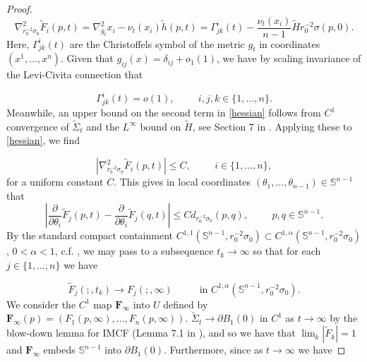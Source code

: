 \documentclass[12pt,twoside]{article}
\theoremstyle{plain}
\theoremstyle{definition}
\theoremstyle{remark}
\numberwithin{equation}{section}
\begin{document}
\begin{proof}
\begin{equation} \label{hessian}
    \nabla^{2}_{r_{0}^{-2}\sigma_{0}} \widetilde{F}_{i} (p,t) = \nabla^{2}_{g_{t}} x_{i} - \nu_{t}(x_{i}) \widetilde{h}(p,t) = \Gamma^{i}_{jk}(t) - \frac{\nu_{t}(x_{i})}{n-1} \widetilde{H} r_{0}^{-2} \sigma(p,0). 
\end{equation}
Here, $\Gamma^{i}_{jk}(t)$ are the Christoffels symbol of the metric $g_{t}$ in coordinates $(x^{1},\dots,x^{n})$. Given that $g_{ij}(x) = \delta_{ij} + o_{1}(1)$, we have by scaling invariance of the Levi-Civita connection that

\begin{equation*}
    \Gamma^{i}_{jk}(t) = o(1), \hspace{1cm} i,j,k \in \{ 1, \dots, n \}. 
\end{equation*}
Meanwhile, an upper bound on the second term in \eqref{hessian} follows from $C^{1}$ convergence of $\widetilde{\Sigma}_{t}$ and the $L^{\infty}$ bound on $\widetilde{H}$, see Section 7 in \cite{HI}. Applying these to \eqref{hessian}, we find

\begin{equation*}
    |\nabla^{2}_{r_{0}^{-2} \sigma_{0}} \widetilde{F}_{i}(p,t) | \leq C, \hspace{1cm} i \in \{ 1, \dots, n \},
\end{equation*}
for a uniform constant $C$. This gives in local coordinates $(\theta_{1},\dots,\theta_{n-1}) \in \mathbb{S}^{n-1}$ that
\begin{equation*}
    |\frac{\partial}{\partial \theta_{i}} \widetilde{F}_{j}(p,t) - \frac{\partial}{\partial \theta_{i}} \widetilde{F}_{j}(q,t)| \leq C d_{r_{0}^{-2} \sigma_{0}} (p, q), \hspace{1cm} p,q \in \mathbb{S}^{n-1}. 
\end{equation*}
By the standard compact containment $C^{1,1}(\mathbb{S}^{n-1},r_{0}^{-2} \sigma_{0}) \subset C^{1,\alpha}(\mathbb{S}^{n-1}, r_{0}^{-2} \sigma_{0})$, $0 <\alpha <1$, c.f. \cite{Aub}, we may pass to a subsequence $t_{k} \rightarrow \infty$ so that for each $j \in \{ 1, \dots, n \}$ we have

\begin{equation} \label{limit_map}
    \widetilde{F}_{j} ( ;, t_{k}) \rightarrow F_{j} (;,\infty) \hspace{1cm} \text{ in    } C^{1,\alpha}(\mathbb{S}^{n-1}, r_{0}^{-2} \sigma_{0}).
\end{equation}
We consider the $C^{1}$ map $\mathbf{F}_{\infty}$ into $U$ defined by $\mathbf{F}_{\infty}(p)= (F_{1}(p,\infty), \dots, F_{n}(p,\infty))$. $\widetilde{\Sigma}_{t} \rightarrow \partial B_{1}(0)$ in $C^{1}$ as $t \rightarrow \infty$ by the blow-down lemma for IMCF (Lemma 7.1 in \cite{HI}), and so we have that $\lim_{k} |\widetilde{F}_{k}| = 1$ and $\mathbf{F}_{\infty}$ embeds $\mathbb{S}^{n-1}$ into $\partial B_{1}(0)$. Furthermore, since as $t \rightarrow \infty$ we have


\end{proof}
\end{document}
